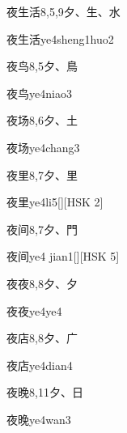 \begin{Entry}{夜生活}{8,5,9}{⼣、⽣、⽔}
  \begin{Phonetics}{夜生活}{ye4sheng1huo2}
  \end{Phonetics}
\end{Entry}

\begin{Entry}{夜鸟}{8,5}{⼣、⿃}
  \begin{Phonetics}{夜鸟}{ye4niao3}
  \end{Phonetics}
\end{Entry}

\begin{Entry}{夜场}{8,6}{⼣、⼟}
  \begin{Phonetics}{夜场}{ye4chang3}
  \end{Phonetics}
\end{Entry}

\begin{Entry}{夜里}{8,7}{⼣、⾥}
  \begin{Phonetics}{夜里}{ye4li5}[][HSK 2]
  \end{Phonetics}
\end{Entry}

\begin{Entry}{夜间}{8,7}{⼣、⾨}
  \begin{Phonetics}{夜间}{ye4 jian1}[][HSK 5]
  \end{Phonetics}
\end{Entry}

\begin{Entry}{夜夜}{8,8}{⼣、⼣}
  \begin{Phonetics}{夜夜}{ye4ye4}
  \end{Phonetics}
\end{Entry}

\begin{Entry}{夜店}{8,8}{⼣、⼴}
  \begin{Phonetics}{夜店}{ye4dian4}
  \end{Phonetics}
\end{Entry}

\begin{Entry}{夜晚}{8,11}{⼣、⽇}
  \begin{Phonetics}{夜晚}{ye4wan3}
  \end{Phonetics}
\end{Entry}

